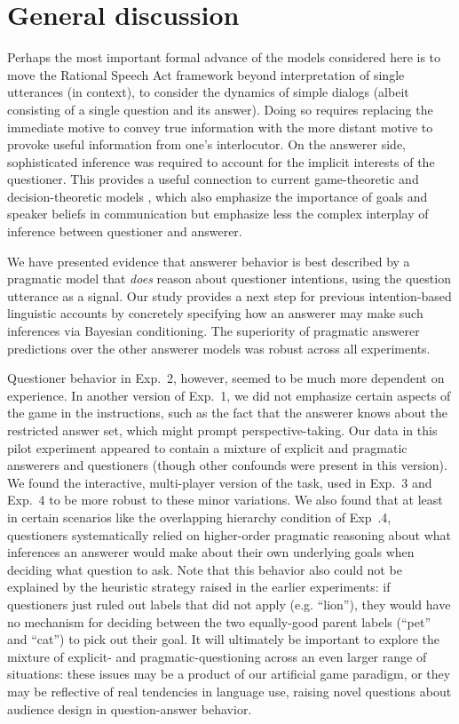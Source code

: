 \documentclass[12pt, floatsintext, man]{apa6}
\begin{document}
\section{General discussion}
\label{sec:gd}

Perhaps the most important formal advance of the models considered here is to move the Rational Speech Act framework beyond interpretation of single utterances (in context), to consider the dynamics of simple dialogs (albeit consisting of a single question and its answer). 
Doing so requires replacing the immediate motive to convey true information with the more distant motive to provoke useful information from one's interlocutor. On the answerer side, sophisticated inference was required to account for the implicit interests of the questioner. This provides a useful connection to current game-theoretic and decision-theoretic models \cite{VogelBodoiaPottsJurafsky13_GricePOMDP, VanRooy03_QuestioningDecisionProblems}, which also emphasize the importance of goals and speaker beliefs in communication but emphasize less the complex interplay of inference between questioner and answerer.

We have presented evidence that answerer behavior is best described by a pragmatic model that \emph{does} reason about questioner intentions, using the question utterance as a signal. Our study provides a next step for previous intention-based linguistic accounts by concretely specifying how an answerer may make such inferences via Bayesian conditioning. The superiority of pragmatic answerer predictions over the other answerer models was robust across all experiments. 

Questioner behavior in Exp.~2, however, seemed to be much more dependent on experience. In another version of Exp.~1, we did not emphasize certain aspects of the game in the instructions, such as the fact that the answerer knows about the restricted answer set, which might prompt perspective-taking. 
Our data in this pilot experiment appeared to contain a mixture of explicit and pragmatic answerers and questioners (though other confounds were present in this version). We found the interactive, multi-player version of the task, used in Exp.~3 and Exp.~4 to be more robust to these minor variations. We also found that at least in certain scenarios like the overlapping hierarchy condition of Exp~.4, questioners systematically relied on higher-order pragmatic reasoning about what inferences an answerer would make about their own underlying goals when deciding what question to ask. Note that this behavior also could not be explained by the heuristic strategy raised in the earlier experiments: if questioners just ruled out labels that did not apply (e.g. ``lion''), they would have no mechanism for deciding between the two equally-good parent labels (``pet'' and ``cat'') to pick out their goal. It will ultimately be important to explore the mixture of explicit- and pragmatic-questioning across an even larger range of situations: these issues may be a product of our artificial game paradigm, or they may be reflective of real tendencies in language use, raising novel questions about audience design in question-answer behavior.
\end{document}
